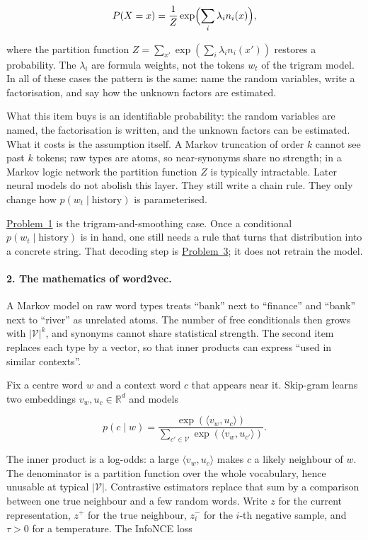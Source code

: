 \documentclass[11pt,a4paper]{article}
\newcommand{\jump}[2]{\hyperref[#1]{#2}}
\theoremstyle{definition}
\begin{document}
\[
P(X=x)
=\frac{1}{Z}\exp\Bigl(\sum_i \lambda_i n_i(x)\Bigr),
\]

where the partition function \(Z=\sum_{x'}\exp(\sum_i \lambda_i n_i(x'))\) restores a probability. The \(\lambda_i\) are formula weights, not the tokens \(w_t\) of the trigram model. In all of these cases the pattern is the same: name the random variables, write a factorisation, and say how the unknown factors are estimated.

What this item buys is an identifiable probability: the random variables are named, the factorisation is written, and the unknown factors can be estimated. What it costs is the assumption itself. A Markov truncation of order \(k\) cannot see past \(k\) tokens; raw types are atoms, so near-synonyms share no strength; in a Markov logic network the partition function \(Z\) is typically intractable. Later neural models do not abolish this layer. They still write a chain rule. They only change how \(p(w_t\mid\text{history})\) is parameterised.

\jump{prob:spr2025-nlp-1}{Problem~1} is the trigram-and-smoothing case. Once a conditional \(p(w_t\mid\text{history})\) is in hand, one still needs a rule that turns that distribution into a concrete string. That decoding step is \jump{prob:spr2025-nlp-3}{Problem~3}; it does not retrain the model.

\paragraph{2. The mathematics of word2vec.}
A Markov model on raw word types treats ``bank'' next to ``finance'' and ``bank'' next to ``river'' as unrelated atoms. The number of free conditionals then grows with \(|\mathcal{V}|^k\), and synonyms cannot share statistical strength. The second item replaces each type by a vector, so that inner products can express ``used in similar contexts''.

Fix a centre word \(w\) and a context word \(c\) that appears near it. Skip-gram learns two embeddings \(v_w,u_c\in\mathbb{R}^d\) and models

\[
p(c\mid w)
=\frac{\exp(\langle v_w,u_c\rangle)}{\sum_{c'\in\mathcal{V}}\exp(\langle v_w,u_{c'}\rangle)}.
\]

The inner product is a log-odds: a large \(\langle v_w,u_c\rangle\) makes \(c\) a likely neighbour of \(w\). The denominator is a partition function over the whole vocabulary, hence unusable at typical \(|\mathcal{V}|\). Contrastive estimators replace that sum by a comparison between one true neighbour and a few random words. Write \(z\) for the current representation, \(z^+\) for the true neighbour, \(z_i^-\) for the \(i\)-th negative sample, and \(\tau>0\) for a temperature. The InfoNCE loss
\end{document}
